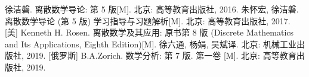 \documentclass[10pt,UTF8]{book} %
\begin{document}


\onecolumn
\begin{thebibliography}{1}
    徐洁磐. 离散数学导论: 第 5 版[M]. 北京: 高等教育出版社, 2016.
    朱怀宏, 徐洁磐. 离散数学导论 (第 5 版) 学习指导与习题解析[M].
    北京: 高等教育出版社, 2017.
    [美] Kenneth H. Rosen. 离散数学及其应用: 原书第 8 版 (Discrete Mathematics 
    and Its Applications, Eighth Edition)[M]. 徐六通, 杨娟, 吴斌译.
    北京: 机械工业出版社, 2019.
    [俄罗斯] B.A.Zorich. 数学分析: 第 7 版. 第一卷 [M].
    北京: 高等教育出版社, 2019.
\end{thebibliography}

\end{document}
